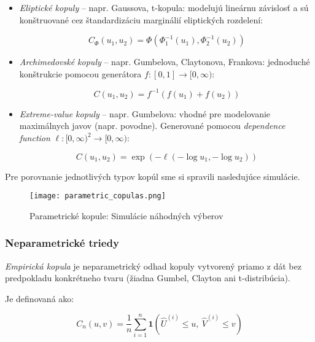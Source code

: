 \begin{itemize}
  \item \textit{Eliptické kopuly} – napr. Gaussova, t-kopula: modelujú lineárnu závislosť a sú konštruované cez štandardizáciu marginálií eliptických rozdelení:
  
  \begin{equation}
    C_{\Phi}(u_1, u_2) = \Phi\left( \Phi_1^{-1}(u_1), \Phi_2^{-1}(u_2) \right)
  \end{equation}

  \item \textit{Archimedovské kopuly} – napr. Gumbelova, Claytonova, Frankova: jednoduché konštrukcie pomocou generátora $f:[0,1] \to [0,\infty)$:

  \begin{equation}
  C(u_1, u_2) = f^{-1}\left( f(u_1) + f(u_2) \right)
  \end{equation}

  \item \textit{Extreme-value kopuly} – napr. Gumbelova: vhodné pre modelovanie maximálnych javov (napr. povodne). Generované pomocou \textit{dependence function} $\ell : [0, \infty)^2 \rightarrow [0, \infty)$:

  \begin{equation}
  C(u_1, u_2) = \exp\left(-\ell(-\log u_1, -\log u_2)\right)
  \end{equation}
  
\end{itemize}

Pre porovnanie jednotlivých typov kopúl sme si spravili nasledujúce simulácie.

\begin{figure}[H]
    \centering
    \texttt{[image: parametric\_copulas.png]}
    \caption{Parametrické kopule: Simulácie náhodných výberov}
    \label{fig:parametric_copulas}
\end{figure}

\subsubsection{Neparametrické triedy}\label{subsubsec:nonparametric_copula}

\textit{Empirická kopula} je neparametrický odhad kopuly vytvorený priamo z dát bez predpokladu konkrétneho tvaru (žiadna Gumbel, Clayton ani t-distribúcia).

Je definovaná ako:

\begin{equation}
C_n(u, v) = \frac{1}{n} \sum_{i=1}^{n} \mathbf{1}\left( \hat{U}^{(i)} \leq u,\ \hat{V}^{(i)} \leq v \right)
\end{equation}

